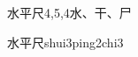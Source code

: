 \begin{entry}{水平尺}{4,5,4}{⽔、⼲、⼫}
  \begin{phonetics}{水平尺}{shui3ping2chi3}
  \end{phonetics}
\end{entry}
